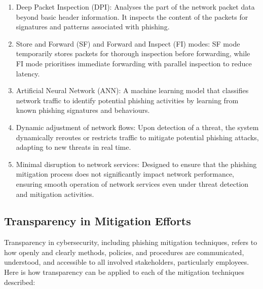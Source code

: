 \begin{enumerate}
    \item Deep Packet Inspection (DPI): Analyses the part of the network packet data beyond basic header information. It inspects the content of the packets for signatures and patterns associated with phishing.
    \item Store and Forward (SF) and Forward and Inspect (FI) modes: SF mode temporarily stores packets for thorough inspection before forwarding, while FI mode prioritises immediate forwarding with parallel inspection to reduce latency.
    \item Artificial Neural Network (ANN): A machine learning model that classifies network traffic to identify potential phishing activities by learning from known phishing signatures and behaviours.
    \item Dynamic adjustment of network flows: Upon detection of a threat, the system dynamically reroutes or restricts traffic to mitigate potential phishing attacks, adapting to new threats in real time.
    \item Minimal disruption to network services: Designed to ensure that the phishing mitigation process does not significantly impact network performance, ensuring smooth operation of network services even under threat detection and mitigation activities.
\end{enumerate}

\subsection{Transparency in Mitigation Efforts}

Transparency in cybersecurity, including phishing mitigation techniques, refers to how openly and clearly methods, policies, and procedures are communicated, understood, and accessible to all involved stakeholders, particularly employees. Here is how transparency can be applied to each of the mitigation techniques described:
\vspace{30px}


